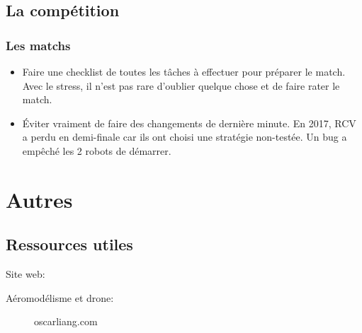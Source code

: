 \documentclass[a4paper, 11pt]{report}
\begin{document}
\chapter{La compétition}

\section{Les matchs}
\begin{itemize}
\item Faire une checklist de toutes les tâches à effectuer pour préparer le match. Avec le stress, il n’est pas rare d’oublier quelque chose et de faire rater le match.
\item Éviter vraiment de faire des changements de dernière minute. En 2017, RCV a perdu en demi-finale car ils ont choisi une stratégie non-testée. Un bug a empêché les 2 robots de démarrer.
\end{itemize}

\part{Autres}

\chapter{Ressources utiles}

Site web:
\begin{description}
\item[Aéromodélisme et drone:] oscarliang.com
\end{description}
\end{document}
